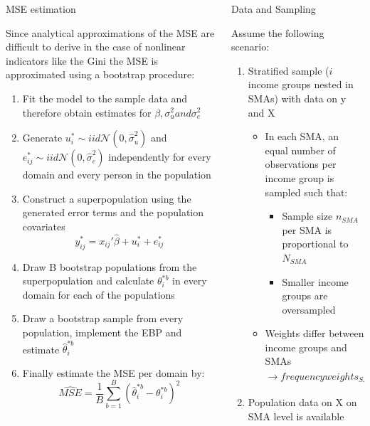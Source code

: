 \documentclass[fleqn,final]{beamer}
\newcommand{\Pheight}{\rule[-5mm]{0cm}{1cm}}
\begin{document}
\begin{frame}
\begin{columns}[t]
\begin{column}{.3\linewidth}
\begin{block}{MSE estimation \Pheight}
Since analytical approximations of the MSE are difficult to derive in the case of nonlinear indicators like the Gini the MSE is approximated using a bootstrap procedure:
\begin{enumerate}
\item Fit the model to the sample data and therefore obtain estimates for $\beta, \sigma_{u}^2 and \sigma_{e}^2$
\item Generate $u_{i}^*\sim iid \mathcal{N}(0,\hat{\sigma}_{u}^2)$ and  $e_{ij}^*\sim iid \mathcal{N}(0,\hat{\sigma}_{e}^2)$ independently for every domain and every person in the population
\item Construct a superpopulation using the generated error terms and the population covariates
\[y_{ij}^*=x_{ij}\prime\hat{\beta}+u_{i}^*+e_{ij}^*\]
\item Draw B bootstrap populations from the superpopulation and calculate $\theta_{i}^{*b}$ in every domain for each of the populations
\item Draw a bootstrap sample from every population, implement the EBP and estimate $\hat{\theta}_{i}^{*b}$
\item Finally estimate the MSE per domain by: 
\[\hat{MSE}=\frac{1}{B}\sum_{b=1}^B (\hat{\theta}_{i}^{*b}-\theta_{i}^{*b})^2\]
\end{enumerate}
\end{block}
\end{column}    



%



\begin{column}{.3\linewidth}

 \begin{block}{Data and Sampling \Pheight}

Assume the following scenario: 
\begin{enumerate}
\item Stratified sample ($i$ income groups nested in SMAs) with data on y and X
\begin{itemize}
\item In each SMA, an equal number of observations per income group is sampled such that:
\begin{itemize}
\item Sample size $n_{SMA}$ per SMA is proportional to  $N_{SMA}$ 
\item Smaller income groups are oversampled
\end{itemize}
\item Weights differ between income groups and SMAs
$\rightarrow frequency weights_{SMA, income group} = {\frac {N_{SMA,income group}} {n_{SMA}/i}} $
\end{itemize}
\item Population data on X on SMA level is available



\end{enumerate}
\end{block}
\end{column}
\end{columns}
\end{frame}
\end{document}
